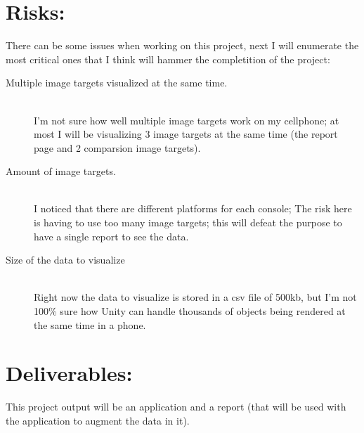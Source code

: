 \documentclass{article}
\begin{document}
\section{Risks:}
There can be some issues when working on this project, next I will enumerate
the most critical ones that I think will hammer the completition of the project:
\begin{description}
  \item[Multiple image targets visualized at the same time.] \hfill \\
    I'm not sure how well multiple image targets work on my
    cellphone; at most I will be visualizing 3 image targets at the same time
    (the report page and 2 comparsion image targets).
  \item[Amount of image targets.] \hfill \\
    I noticed that there are different platforms for each console; The risk
    here is having to use too many image targets; this will defeat the
    purpose to have a single report to see the data.
  \item[Size of the data to visualize] \hfill \\
    Right now the data to visualize is stored in a csv file of 500kb, but I'm
    not 100\% sure how Unity can handle thousands of objects being rendered
    at the same time in a phone.

\end{description}

\section{Deliverables:}
This project output will be an application and a report (that will be used
with the application to augment the data in it).
\end{document}
